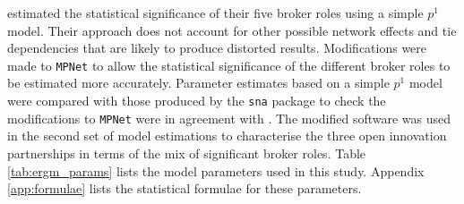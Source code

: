 
\citet{gould1989structures} estimated the statistical significance of their five broker roles using a simple $p^1$ model. Their approach does not account for other possible network effects and tie dependencies that are likely to produce distorted results. Modifications were made to \texttt{MPNet} to allow the statistical significance of the different broker roles to be estimated more accurately. Parameter estimates based on a simple $p^1$ model were compared with those produced by the \texttt{sna} package \citep{butts2016sna} to check the modifications to \texttt{MPNet} were in agreement with \citet{gould1989structures}. The modified software was used in the second set of model estimations to characterise the three open innovation partnerships in terms of the mix of significant broker roles. Table \ref{tab:ergm_params} lists the model parameters used in this study. Appendix \ref{app:formulae} lists the statistical formulae for these parameters. \medskip

